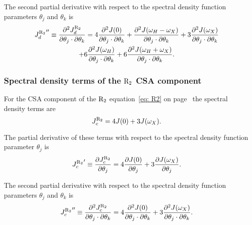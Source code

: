 \noindent The second partial derivative with respect to the spectral density function parameters $\theta_j$ and $\theta_k$ is
\begin{multline}
    {J_d^{\mathrm{R}_2}}'' \equiv \frac{\partial^2 J_d^{\mathrm{R}_2}}{\partial \theta_j \cdot \partial \theta_k}
        = 4 \frac{\partial^2 J(0)}{\partial \theta_j \cdot \partial \theta_k}
        + \frac{\partial^2 J(\omega_H - \omega_X)}{\partial \theta_j \cdot \partial \theta_k}
        + 3 \frac{\partial^2 J(\omega_X)}{\partial \theta_j \cdot \partial \theta_k} \\
        + 6 \frac{\partial^2 J(\omega_H)}{\partial \theta_j \cdot \partial \theta_k}
        + 6 \frac{\partial^2 J(\omega_H + \omega_X)}{\partial \theta_j \cdot \partial \theta_k}.  \label{eq: J terms: JR2d"}
\end{multline}


\subsubsection{Spectral density terms of the $\mathrm{R}_2$ CSA component}

For the CSA component of the $\mathrm{R}_2$ equation~\eqref{eq: R2} on page~\pageref{eq: R2} the spectral density terms are
\begin{equation}
    J_c^{\mathrm{R}_2} = 4J(0) + 3J(\omega_X).  \label{eq: J terms: JR2c}
\end{equation}

\noindent The partial derivative of these terms with respect to the spectral density function parameter $\theta_j$ is
\begin{equation}
    {J_c^{\mathrm{R}_2}}' \equiv \frac{\partial J_c^{\mathrm{R}_2}}{\partial \theta_j}
        = 4 \frac{\partial J(0)}{\partial \theta_j}
        + 3 \frac{\partial J(\omega_X)}{\partial \theta_j}.  \label{eq: J terms: JR2c'}
\end{equation}

\noindent The second partial derivative with respect to the spectral density function parameters $\theta_j$ and $\theta_k$ is
\begin{equation}
    {J_c^{\mathrm{R}_2}}'' \equiv \frac{\partial^2 J_c^{\mathrm{R}_2}}{\partial \theta_j \cdot \partial \theta_k}
        = 4 \frac{\partial^2 J(0)}{\partial \theta_j \cdot \partial \theta_k}
        + 3 \frac{\partial^2 J(\omega_X)}{\partial \theta_j \cdot \partial \theta_k}.  \label{eq: J terms: JR2c"}
\end{equation}


